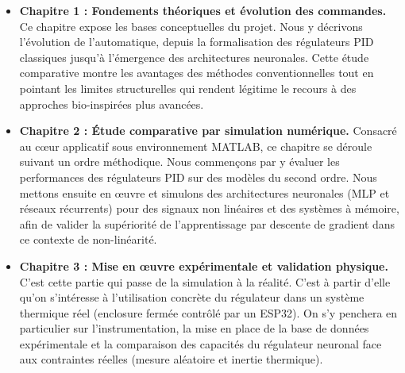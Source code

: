 \begin{itemize}[label=$\bullet$]
	\item \textbf{Chapitre 1 : Fondements théoriques et évolution des commandes.} Ce chapitre expose les bases conceptuelles du projet. Nous y décrivons l’évolution de l’automatique, depuis la formalisation des régulateurs PID classiques jusqu’à l’émergence des architectures neuronales. Cette étude comparative montre les avantages des méthodes conventionnelles tout en pointant les limites structurelles qui rendent légitime le recours à des approches bio-inspirées plus avancées.
	
	\item \textbf{Chapitre 2 : Étude comparative par simulation numérique.} Consacré au cœur applicatif sous environnement MATLAB, ce chapitre se déroule suivant un ordre méthodique. Nous commençons par y évaluer les performances des régulateurs PID sur des modèles du second ordre. Nous mettons ensuite en œuvre et simulons des architectures neuronales (MLP et réseaux récurrents) pour des signaux non linéaires et des systèmes à mémoire, afin de valider la supériorité de l'apprentissage par descente de gradient dans ce contexte de non-linéarité.
	
	\item \textbf{Chapitre 3 : Mise en œuvre expérimentale et validation physique.} C'est cette partie qui passe de la simulation à la réalité. C'est à partir d'elle qu'on s'intéresse à l'utilisation concrète du régulateur dans un système thermique réel (enclosure fermée contrôlé par un ESP32). On s'y penchera en particulier sur l'instrumentation, la mise en place de la base de données expérimentale et la comparaison des capacités du régulateur neuronal face aux contraintes réelles (mesure aléatoire et inertie thermique).
\end{itemize}